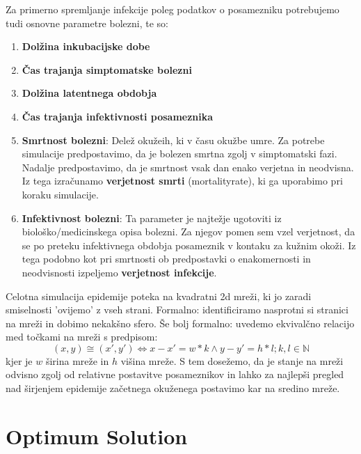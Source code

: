 \documentclass[a4paper, 11pt]{article}
\begin{document}
Za primerno spremljanje infekcije poleg podatkov o posamezniku potrebujemo tudi osnovne parametre bolezni, te so:
\begin{enumerate}
\item \textbf{Dolžina inkubacijske dobe}
\item \textbf{Čas trajanja simptomatske bolezni}
\item \textbf{Dolžina latentnega obdobja}
\item \textbf{Čas trajanja infektivnosti posameznika}
\item \textbf{Smrtnost bolezni}: Delež okužeih, ki v času okužbe umre. Za potrebe simulacije predpostavimo, da je bolezen smrtna zgolj v simptomatski fazi. Nadalje predpostavimo, da je smrtnost vsak dan enako verjetna in neodvisna. Iz tega izračunamo \textbf{verjetnost smrti} (mortality\textunderscore rate), ki ga uporabimo pri koraku simulacije.
\item \textbf{Infektivnost bolezni}: Ta parameter je najtežje ugotoviti iz biološko/medicinskega opisa bolezni. Za njegov pomen sem vzel verjetnost, da se po preteku infektivnega obdobja posameznik v kontaku za kužnim okoži. Iz tega podobno kot pri smrtnosti ob predpostavki o enakomernosti in neodvisnosti izpeljemo \textbf{verjetnost infekcije}.

\end{enumerate}

Celotna simulacija epidemije poteka na kvadratni 2d mreži, ki jo zaradi smiselnosti 'ovijemo' z vseh strani. Formalno: identificiramo nasprotni si stranici na mreži in dobimo nekakšno sfero. Še bolj formalno: uvedemo ekvivalčno relacijo med točkami na mreži s predpisom: 
$$(x,y) \cong (x',y') \iff x-x' = w*k \land y-y' = h*l; k,l \in \mathbb{N}$$
kjer je $w$ širina mreže in $h$ višina mreže. S tem dosežemo, da je stanje na mreži odvisno zgolj od relativne postavitve posameznikov in lahko za najlepši pregled nad širjenjem epidemije začetnega okuženega postavimo kar na sredino mreže.

\section*{Optimum Solution}
\lipsum[4]
\end{document}
